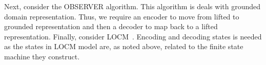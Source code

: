 \documentclass{article}
\theoremstyle{definition}
\theoremstyle{remark}
\newcommand{\realm}{{\ensuremath{M^*}}\xspace}
\newif\ifaddcomments
\newcommand{\roni}[1]{\ifaddcomments{\textcolor{red}{[Roni: #1]}}\fi}
\newcommand{\yarin}[1]{\ifaddcomments{\textcolor{teal}{[Yarin: #1]}}\fi}
\newcommand{\leo}[1]{\ifaddcomments{\textcolor{pink}{[Leonardo: #1]}}\fi}
\begin{document}
Next, consider the OBSERVER\citep{wang1996learning} algorithm. 
This algorithm is deals with grounded domain representation. 
Thus, we require an encoder to move from lifted to grounded representation and then a decoder to map back to a lifted representation. 
Finally, consider LOCM~\citep{cresswell2013acquiring}. 
Encoding and decoding states is needed as the states in LOCM model are, as noted above, related to the finite state machine they construct. 















\end{document}
